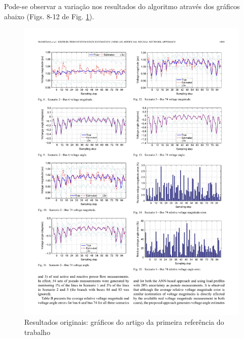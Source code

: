 \documentclass{IEEEtran}
\begin{document}
Pode-se observar a variação nos resultados do algoritmo através dos gráficos abaixo (Figs. 8-12 de Fig. \ref{topologia_full}).
\begin{figure}
	\centering
	\includegraphics{topologia_full.pdf}
	\caption{Resultados originais: gráficos do artigo da primeira referência do trabalho}
	\label{topologia_full}
\end{figure}
\end{document}
